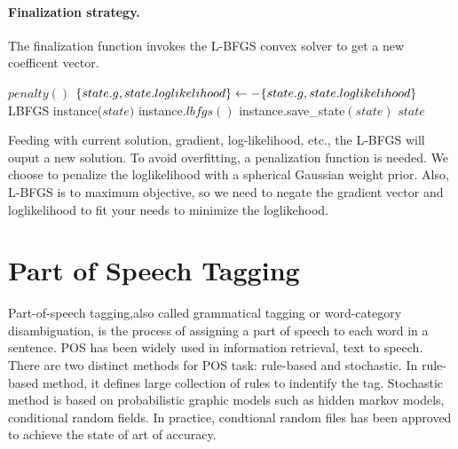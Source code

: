 \paragraph{Finalization strategy.}
The finalization function invokes the L-BFGS convex solver to get a new coefficent vector.\\

\begin{algorithm} \label{alg:CRF training}
\begin{algorithmic}[1]
        \State $penalty()$  
        \State $\{state.g,state.loglikelihood\}\leftarrow-\{state.g,state.loglikelihood\}$ 
        \State LBFGS instance($state)$ 
        \State instance.$lbfgs()$ 
        \State instance.save\_state$(state)$ 
        \State \Return $state$
\end{algorithmic}
\end{algorithm}

Feeding with current solution, gradient, log-likelihood, etc., the L-BFGS will ouput a new solution.
To avoid overfitting, a penalization function is needed. We choose to penalize the loglikelihood with a spherical Gaussian weight prior.
Also, L-BFGS is to maximum objective, so we need to negate the gradient vector and loglikelihood to fit your needs to minimize the loglikehood.

\section{Part of Speech Tagging}
Part-of-speech tagging,also called grammatical tagging or word-category disambiguation, is the process of assigning 
a part of speech to each word in a sentence. POS has been widely used in information retrieval, text to speech. There are two distinct methods for 
POS task: rule-based and stochastic.
In rule-based method, it defines large collection of rules to indentify the tag. Stochastic method is based on probabilistic 
graphic models such as hidden markov models, conditional random fields. In practice, condtional random files has been approved 
to achieve the state of art of accuracy.
